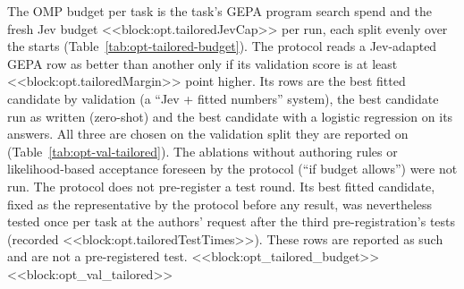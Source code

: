 \noindent The OMP budget per task is the task's GEPA program search spend and the fresh Jev budget <<block:opt.tailoredJevCap>> per run, each split evenly over the starts (Table~\ref{tab:opt-tailored-budget}). The protocol reads a Jev-adapted GEPA row as better than another only if its validation score is at least <<block:opt.tailoredMargin>> point higher. Its rows are the best fitted candidate by validation (a ``Jev + fitted numbers'' system), the best candidate run as written (zero-shot) and the best candidate with a logistic regression on its answers. All three are chosen on the validation split they are reported on (Table~\ref{tab:opt-val-tailored}). The ablations without authoring rules or likelihood-based acceptance foreseen by the protocol (``if budget allows'') were not run. The protocol does not pre-register a test round. Its best fitted candidate, fixed as the representative by the protocol before any result, was nevertheless tested once per task at the authors' request after the third pre-registration's tests (recorded <<block:opt.tailoredTestTimes>>). These rows are reported as such and are not a pre-registered test.
<<block:opt_tailored_budget>>
<<block:opt_val_tailored>>

